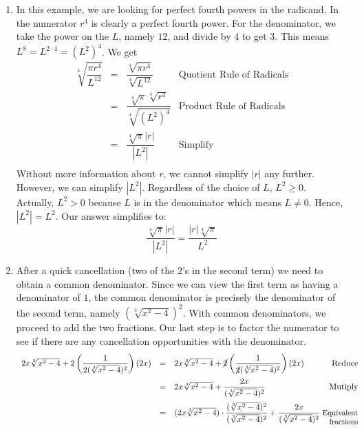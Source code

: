 \documentclass{ximera}
\begin{document}
\begin{example}
\begin{enumerate}
\item  In this example, we are looking for perfect fourth powers in the radicand.  In the numerator $r^4$ is clearly a perfect fourth power.  For the denominator, we take the power on the $L$, namely $12$, and divide by $4$ to get $3$.  This means $L^{8} = L^{2\cdot 4} = (L^2)^{4}$.  We get \[ \begin{array}{rclr}

\sqrt[4]{\dfrac{\pi r^{4}}{L^{12}}} & = & \dfrac{\sqrt[4]{\pi r^{4}}}{\sqrt[4]{L^{12}}} & \text{Quotient Rule of Radicals} \\ [12pt]

                                    & = & \dfrac{\sqrt[4]{\pi}\sqrt[4]{r^{4}}}{\sqrt[4]{(L^2)^{4}}} & \text{Product Rule of Radicals} \\ [12pt]
																		& = & \dfrac{\sqrt[4]{\pi}|r|}{|L^2|} & \text{Simplify} \\
																	
\end{array}\]  Without more information about $r$, we cannot simplify $|r|$ any further.  However, we can simplify $|L^2|$.  Regardless of the choice of $L$, $L^2 \geq 0$. Actually, $L^2 > 0$ because $L$ is in the denominator which means $L \neq 0$. Hence, $|L^2| = L^2$.  Our answer simplifies to: \[ \dfrac{\sqrt[4]{\pi}|r|}{|L^2|} = \dfrac{|r|\sqrt[4]{\pi}}{L^2} \]

\item After a quick cancellation (two of the $2$'s in the second term) we need to obtain a common denominator.  Since we can view the first term as having a denominator of $1$,  the common denominator is precisely the denominator of the second term, namely $(\sqrt[3]{x^2-4})^2$.  With common denominators, we proceed to add the two fractions.  Our last step is to factor the numerator to see if there are any cancellation opportunities with the denominator.\[ \begin{array}{rclr}

2x \sqrt[3]{x^2-4} + 2\left(\dfrac{1}{2(\sqrt[3]{x^2-4})^2}\right)  (2x) & = & 2x \sqrt[3]{x^2-4} + \cancel{2}\left(\dfrac{1}{\cancel{2}(\sqrt[3]{x^2-4})^2}\right)  (2x) & \text{Reduce}\\ [12pt]

& = & 2x \sqrt[3]{x^2-4} + \dfrac{2x}{(\sqrt[3]{x^2-4})^2} & \text{Mutiply} \\[12pt]

& = & (2x \sqrt[3]{x^2-4}) \cdot \dfrac{(\sqrt[3]{x^2-4})^2}{(\sqrt[3]{x^2-4})^2} + \dfrac{2x}{(\sqrt[3]{x^2-4})^2} & \hspace*{-.1in}\text{\small Equivalent} \\ [-8pt]
&   &                                                                                                               & \text{\small fractions} \\


\end{array}\]
\end{enumerate}
\end{example}
\end{document}
